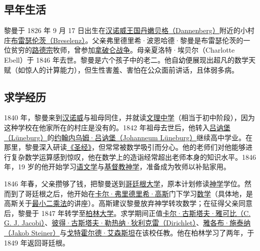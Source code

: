 \subsection{早年生活}\label{Early_years}

黎曼于 1826 年 9 月 17 日出生在\href{https://en.wikipedia.org/wiki/Kingdom_of_Hanover}{汉诺威王国}\href{https://en.wikipedia.org/wiki/Dannenberg_(Elbe)}{丹嫩贝格（Dannenberg）}附近的小村庄\href{https://en.wikipedia.org/wiki/Breselenz}{布雷瑟伦茨（Breselenz）}。父亲弗里德里希·波恩哈德·黎曼是布雷瑟伦茨的一位贫穷的\href{https://en.wikipedia.org/wiki/Lutheranism}{路德宗}牧师，曾参加\href{https://en.wikipedia.org/wiki/Napoleonic_Wars}{拿破仑战争}。母亲夏洛特·埃贝尔（Charlotte Ebell）于 1846 年去世。黎曼是六个孩子中的老二。他自幼便展现出超凡的数学天赋（如惊人的计算能力），但生性害羞、害怕在公众面前讲话，且体弱多病。


\subsection{求学经历}\label{Education}

1840 年，黎曼来到\href{https://en.wikipedia.org/wiki/Hanover}{汉诺威}与祖母同住，并就读\href{https://en.wikipedia.org/wiki/Lyceum}{文理中学}（相当于初中阶段），因为这种学校在他家所在的村庄是没有的。1842 年祖母去世后，他转入\href{https://en.wikipedia.org/wiki/Lüneburg}{吕讷堡（Lüneburg）}的\href{https://de.wikipedia.org/wiki/Johanneum\%20Lüneburg}{约翰内乌姆·吕讷堡（Johanneum Lüneburg）}继续高中学业。在那里，黎曼深入研读\href{https://en.wikipedia.org/wiki/Bible}{《圣经》}，但常常被数学吸引而分心。他的老师们对他能够进行复杂数学运算感到惊叹，他在数学上的造诣经常超出老师本身的知识水平。1846 年，19 岁的他开始学习\href{https://en.wikipedia.org/wiki/Philology}{语文学}与\href{https://en.wikipedia.org/wiki/Christian_theology}{基督教神学}，准备成为牧师以补贴家用。

1846 年春，父亲攒够了钱，把黎曼送到\href{https://en.wikipedia.org/wiki/University_of_Göttingen}{哥廷根大学}，原本计划修读\href{https://en.wikipedia.org/wiki/Theology}{神学}学位。然而到了哥廷根之后，他开始在\href{https://en.wikipedia.org/wiki/Carl_Friedrich_Gauss}{卡尔·弗里德里希·高斯}门下学习\href{https://en.wikipedia.org/wiki/Mathematics}{数学}（具体地，是高斯关于\href{https://en.wikipedia.org/wiki/Method_of_least_squares}{最小二乘法}的讲座）。高斯建议黎曼放弃神学转攻数学；在征得父亲同意后，黎曼于 1847 年转学至\href{https://en.wikipedia.org/wiki/University_of_Berlin}{柏林大学}。求学期间正值\href{https://en.wikipedia.org/wiki/Carl_Gustav_Jacob_Jacobi}{卡尔·古斯塔夫·雅可比（C. G. J. Jacobi）}、\href{https://en.wikipedia.org/wiki/Peter_Gustav_Lejeune_Dirichlet}{彼得·古斯塔夫·勒热纳·狄利克雷（Dirichlet）}、\href{https://en.wikipedia.org/wiki/Jakob_Steiner}{雅各布·施泰纳（Jakob Steiner）}与\href{https://en.wikipedia.org/wiki/Gotthold_Eisenstein}{戈特霍尔德·艾森斯坦}在该校任教。他在柏林学习了两年，于 1849 年返回哥廷根。


